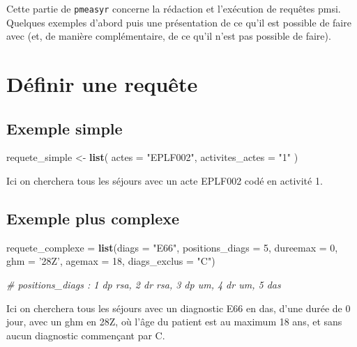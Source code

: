 \documentclass[]{book}
\newenvironment{Shaded}{\begin{snugshade}}{\end{snugshade}}
\newcommand{\KeywordTok}[1]{\textcolor[rgb]{0.13,0.29,0.53}{\textbf{#1}}}
\newcommand{\DataTypeTok}[1]{\textcolor[rgb]{0.13,0.29,0.53}{#1}}
\newcommand{\DecValTok}[1]{\textcolor[rgb]{0.00,0.00,0.81}{#1}}
\newcommand{\StringTok}[1]{\textcolor[rgb]{0.31,0.60,0.02}{#1}}
\newcommand{\CommentTok}[1]{\textcolor[rgb]{0.56,0.35,0.01}{\textit{#1}}}
\newcommand{\NormalTok}[1]{#1}
\theoremstyle{definition}
\theoremstyle{definition}
\theoremstyle{definition}
\theoremstyle{remark}
\begin{document}
Cette partie de \texttt{pmeasyr} concerne la rédaction et l'exécution de
requêtes pmsi. Quelques exemples d'abord puis une présentation de ce
qu'il est possible de faire avec (et, de manière complémentaire, de ce
qu'il n'est pas possible de faire).

\section{Définir une requête}\label{definir-une-requete}

\subsection{Exemple simple}\label{exemple-simple}

\begin{Shaded}
\begin{Highlighting}[]
\NormalTok{requete_simple <-}\StringTok{ }\KeywordTok{list}\NormalTok{(}
  \DataTypeTok{actes =} \StringTok{"EPLF002"}\NormalTok{, }
  \DataTypeTok{activites_actes =} \StringTok{"1"}
\NormalTok{)}
\end{Highlighting}
\end{Shaded}

Ici on cherchera tous les séjours avec un acte EPLF002 codé en activité
1.

\subsection{Exemple plus complexe}\label{exemple-plus-complexe}

\begin{Shaded}
\begin{Highlighting}[]
\NormalTok{requete_complexe =}\StringTok{ }\KeywordTok{list}\NormalTok{(}\DataTypeTok{diags =} \StringTok{"E66"}\NormalTok{, }
                        \DataTypeTok{positions_diags =} \DecValTok{5}\NormalTok{, }
                        \DataTypeTok{dureemax =} \DecValTok{0}\NormalTok{,}
                        \DataTypeTok{ghm =} \StringTok{'28Z'}\NormalTok{,}
                        \DataTypeTok{agemax =} \DecValTok{18}\NormalTok{,}
                        \DataTypeTok{diags_exclus =} \StringTok{"C"}\NormalTok{)}

\CommentTok{# positions_diags : 1 dp rsa, 2 dr rsa, 3 dp um, 4 dr um, 5 das}
\end{Highlighting}
\end{Shaded}

Ici on cherchera tous les séjours avec un diagnostic E66 en das, d'une
durée de 0 jour, avec un ghm en 28Z, où l'âge du patient est au maximum
18 ans, et sans aucun diagnostic commençant par C.
\end{document}
